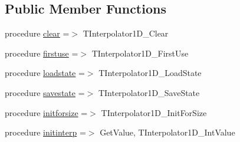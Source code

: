 \subsection*{Public Member Functions}
\begin{DoxyCompactItemize}
\item 
procedure \mbox{\hyperlink{structinterpolation_1_1tinterpolator1d_aa58f19807ce210a1d45d3c3a56ee2633}{clear}} =$>$ T\+Interpolator1\+D\+\_\+\+Clear
\item 
procedure \mbox{\hyperlink{structinterpolation_1_1tinterpolator1d_a0cdf6e011498f0534bf443bf2fbfb3dd}{firstuse}} =$>$ T\+Interpolator1\+D\+\_\+\+First\+Use
\item 
procedure \mbox{\hyperlink{structinterpolation_1_1tinterpolator1d_a4ebef5573d1b7bbcb512e482961dfc43}{loadstate}} =$>$ T\+Interpolator1\+D\+\_\+\+Load\+State
\item 
procedure \mbox{\hyperlink{structinterpolation_1_1tinterpolator1d_a3062dd1ef35bcc32d4f595f19b06c95b}{savestate}} =$>$ T\+Interpolator1\+D\+\_\+\+Save\+State
\item 
procedure \mbox{\hyperlink{structinterpolation_1_1tinterpolator1d_a55e61e0b9dc3dddf10f99abd23f94ff4}{initforsize}} =$>$ T\+Interpolator1\+D\+\_\+\+Init\+For\+Size
\item 
procedure \mbox{\hyperlink{structinterpolation_1_1tinterpolator1d_acbc4b887acf64342c64ade922c1447ad}{initinterp}} =$>$ Get\+Value, T\+Interpolator1\+D\+\_\+\+Int\+Value
\end{DoxyCompactItemize}
